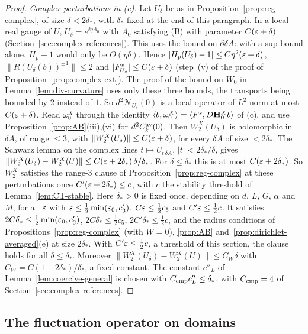 \begin{proof}
\emph{Complex perturbations in (c).} Let $U_\delta$ be as in Proposition~\ref{prop:reg-complex}, of size $\delta<2\delta_*$, with $\delta_*$ fixed at the end of this paragraph. In a local real gauge of $U$, $U_\delta=e^{\ii\eta A_0}$ with $A_0$ satisfying (B) with parameter $C(\varepsilon+\delta)$ (Section~\ref{sec:complex-references}). This uses the bound on $\partial\delta\!A$: with a sup bound alone, $H_p-1$ would only be $O(\eta\delta)$. Hence $|H_p(U_\delta)-1|\le C\eta^2(\varepsilon+\delta)$, $\|R(U_\delta(b))^{\pm1}\|\le2$ and $|F^s_{U_\delta}|\le C(\varepsilon+\delta)$ (step~(v) of the proof of Proposition~\ref{prop:complex-ext}). The proof of the bound on $W_0$ in Lemma~\ref{lem:div-curvature} uses only these three bounds, the transports being bounded by $2$ instead of $1$. So $d^2\mathcal N_{U_\delta}(0)$ is a local operator of $L^2$ norm at most $C(\varepsilon+\delta)$. Read $\omega_0^X$ through the identity $\langle b,\omega_0^X\rangle=\langle F^s,D\mathbf H^X_0b\rangle$ of (c), and use Proposition~\ref{prop:AB}(iii),(vi) for $d^2C^{\rm av}_k(0)$. Then $W_2^X(U_\delta)$ is holomorphic in $\delta\!A$, of range $\le3$, with $\|W_2^X(U_\delta)\|\le C(\varepsilon+\delta)$, for every $\delta\!A$ of size $<2\delta_*$. The Schwarz lemma on the complex lines $t\mapsto U_{t\,\delta\!A}$, $|t|<2\delta_*/\delta$, gives $\|W_2^X(U_\delta)-W_2^X(U)\|\le C(\varepsilon+2\delta_*)\,\delta/\delta_*$. For $\delta\le\delta_*$ this is at most $C(\varepsilon+2\delta_*)$. So $W_2^X$ satisfies the range-$3$ clause of Proposition~\ref{prop:reg-complex} at these perturbations once $C'(\varepsilon+2\delta_*)\le c$, with $c$ the stability threshold of Lemma~\ref{lem:CT-stable}. Here $\delta_*>0$ is fixed once, depending on $d$, $L$, $G$, $\alpha$ and $M$, for all $\varepsilon$ with $\varepsilon\le\frac12\min(\varepsilon_0,c'_3)$, $C\varepsilon\le\frac12c_5$ and $C'\varepsilon\le\frac12c$. It satisfies $2C\delta_*\le\frac12\min(\varepsilon_0,c'_3)$, $2C\delta_*\le\frac12c_5$, $2C'\delta_*\le\frac12c$, and the radius conditions of Propositions~\ref{prop:reg-complex} (with $W=0$), \ref{prop:AB} and~\ref{prop:dirichlet-averaged}(e) at size $2\delta_*$. With $C'\varepsilon\le\frac12c$, a threshold of this section, the clause holds for all $\delta\le\delta_*$. Moreover $\|W_2^X(U_\delta)-W_2^X(U)\|\le C_W\delta$ with $C_W=C(1+2\delta_*)/\delta_*$, a fixed constant. The constant $c''_L$ of Lemma~\ref{lem:coercive-general} is chosen with $C_{\rm cmp}c''_L\le\delta_*$, with $C_{\rm cmp}=4$ of Section~\ref{sec:complex-references}.
\end{proof}

\subsection{The fluctuation operator on domains}\label{ss:37.4}

